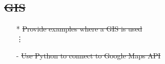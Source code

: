 \documentclass[12pt]{article}%
\begin{document}
\subsection*{\st{GIS}}
\begin{itemize}
 \setlength{\itemsep}{1pt}%
    \setlength{\parskip}{1pt}
\item[*] \st{Provide examples where a GIS is used}\\
\vdots
\item[-] \st{Use Python to connect to Google Maps API}
\end{itemize}
\end{document}
